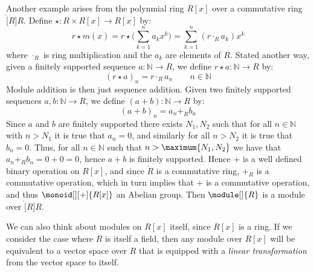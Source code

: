     \begin{example}
        Another example arises from the polynmial ring $R[x]$ over a commutative
        ring $\ring[R]{R}$. Define $\star:R\times{R}[x]\rightarrow{R}[x]$ by:
        \begin{equation}
            r\star{m}(x)=r\star\Big(\sum_{k=1}^{n}a_{k}x^{k}\Big)
                        =\sum_{k=1}^{n}(r\cdot_{R}{a}_{k})x^{k}
        \end{equation}
        where $\cdot_{R}$ is ring multiplication and the $a_{k}$ are elements of
        $R$. Stated another way, given a finitely supported sequence
        $a:\mathbb{N}\rightarrow{R}$, we define
        $r\star{a}:\mathbb{N}\rightarrow{R}$ by:
        \begin{equation}
            (r\star{a})_{n}=r\cdot_{R}a_{n}
            \quad\quad
            n\in\mathbb{N}
        \end{equation}
        Module addition is then just sequence addition. Given two finitely
        supported sequences $a,b:\mathbb{N}\rightarrow{R}$, we define
        $(a+b):\mathbb{N}\rightarrow{R}$ by:
        \begin{equation}
            (a+b)_{n}=a_{n}+_{R}b_{n}
        \end{equation}
        Since $a$ and $b$ are finitely supported there exists $N_{1},N_{2}$
        such that for all $n\in\mathbb{N}$ with $n>N_{1}$ it is true that
        $a_{n}=0$, and similarly for all $n>N_{2}$ it is true that $b_{n}=0$.
        Thus, for all $n\in\mathbb{N}$ such that $n>\maximum{N_{1},N_{2}}$
        we have that $a_{n}+_{R}b_{n}=0+0=0$, hence $a+b$ is finitely supported.
        Hence $+$ is a well defined binary operation on $R[x]$, and since
        $\ring{R}$ is a commutative ring, $+_{R}$ is a commutative operation,
        which in turn implies that $+$ is a commutative operation, and thus
        $\monoid[][+]{R[x]}$ an Abelian group. Then $\module[]{R}$ is a module
        over $\ring[R]{R}$.
    \end{example}
    \begin{example}
        We can also think about modules on $R[x]$ itself, since $R[x]$ is a
        ring. If we consider the case where $R$ is itself a field, then any
        module over $R[x]$ will be equivalent to a vector space over $R$ that is
        equipped with a \textit{linear transformation} from the vector space
        to itself.
    \end{example}

